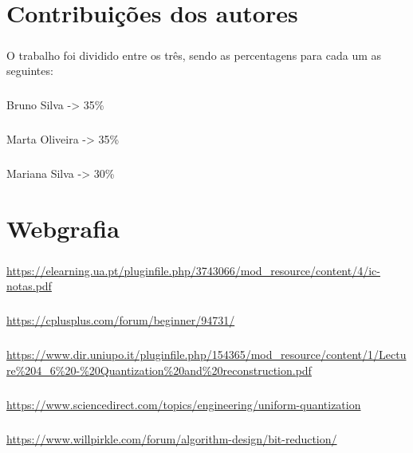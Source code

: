 \documentclass{report}
\begin{document}
\chapter*{Contribuições dos autores}
\paragraph{}
O trabalho foi dividido entre os três, sendo as percentagens para cada um as seguintes:
\paragraph{}
Bruno Silva -> 35\%
\paragraph{}
Marta Oliveira -> 35\%
\paragraph{}
Mariana Silva -> 30\%

\chapter*{Webgrafia}
\paragraph{}
\url{https://elearning.ua.pt/pluginfile.php/3743066/mod_resource/content/4/ic-notas.pdf}
\paragraph{}
\url{https://cplusplus.com/forum/beginner/94731/}
\paragraph{}
\url{https://www.dir.uniupo.it/pluginfile.php/154365/mod_resource/content/1/Lecture\%204_6\%20-\%20Quantization\%20and\%20reconstruction.pdf}
\paragraph{}
\url{https://www.sciencedirect.com/topics/engineering/uniform-quantization}
\paragraph{}
\url{https://www.willpirkle.com/forum/algorithm-design/bit-reduction/}

\end{document}
